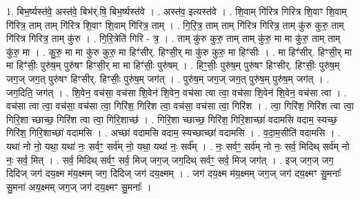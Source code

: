 \documentclass[17pt]{extarticle}
\begin{document}
1. बिभ॒र्ष्यस्त॑वे॒ अस्त॑वे॒ बिभ॑र्.षि॒ बिभ॒र्ष्यस्त॑वे । . अस्त॑व॒ इत्यस्त॑वे । . शि॒वाम् गि॑रित्र गिरित्र शि॒वाꣳ शि॒वाम् गि॑रित्र॒ ताम् ताम् गि॑रित्र शि॒वाꣳ शि॒वाम् गि॑रित्र॒ ताम् । . गि॒रि॒त्र॒ ताम् ताम् गि॑रित्र गिरित्र॒ ताम् कु॑रु कुरु॒ ताम् गि॑रित्र गिरित्र॒ ताम् कु॑रु । . गि॒रि॒त्रेति॑ गिरि - त्र॒ । . ताम् कु॑रु कुरु॒ ताम् ताम् कु॑रु॒ मा मा कु॑रु॒ ताम् ताम् कु॑रु॒ मा । . कु॒रु॒ मा मा कु॑रु कुरु॒ मा हिꣳ॑सीर्. हिꣳसी॒र् मा कु॑रु कुरु॒ मा हिꣳ॑सीः । . मा हिꣳ॑सीर्. हिꣳसी॒र् मा मा हिꣳ॑सीः॒ पुरु॑ष॒म् पुरु॑षꣳ हिꣳसी॒र् मा मा हिꣳ॑सीः॒ पुरु॑षम् । . हिꣳ॒॒सीः॒ पुरु॑ष॒म् पुरु॑षꣳ हिꣳसीर्. हिꣳसीः॒ पुरु॑ष॒म् जग॒ज् जग॒त् पुरु॑षꣳ हिꣳसीर्. हिꣳसीः॒ पुरु॑ष॒म् जग॑त् । . पुरु॑ष॒म् जग॒ज् जग॒त् पुरु॑ष॒म् पुरु॑ष॒म् जग॑त् । . जग॒दिति॒ जग॑त् । . शि॒वेन॒ वच॑सा॒ वच॑सा शि॒वेन॑ शि॒वेन॒ वच॑सा त्वा त्वा॒ वच॑सा शि॒वेन॑ शि॒वेन॒ वच॑सा त्वा । . वच॑सा त्वा त्वा॒ वच॑सा॒ वच॑सा त्वा॒ गिरि॑श॒ गिरि॑श त्वा॒ वच॑सा॒ वच॑सा त्वा॒ गिरि॑श । . त्वा॒ गिरि॑श॒ गिरि॑श त्वा त्वा॒ गिरि॒शा च्छाच्छ॒ गिरि॑श त्वा त्वा॒ गिरि॒शाच्छ॑ । . गिरि॒शा च्छाच्छ॒ गिरि॑श॒ गिरि॒शाच्छा॑ वदामसि वदाम॒ स्यच्छ॒ गिरि॑श॒ गिरि॒शाच्छा॑ वदामसि । . अच्छा॑ वदामसि वदाम॒ स्यच्छाच्छा॑ वदामसि । . व॒दा॒म॒सीति॑ वदामसि । . यथा॑ नो नो॒ यथा॒ यथा॑ नः॒ सर्वꣳ॒॒ सर्व॑म् नो॒ यथा॒ यथा॑ नः॒ सर्व᳚म् । . नः॒ सर्वꣳ॒॒ सर्व॑म् नो नः॒ सर्व॒ मिदिथ् सर्व॑म् नो नः॒ सर्व॒ मित् । . सर्व॒ मिदिथ् सर्वꣳ॒॒ सर्व॒ मिज् जग॒ज् जग॒दिथ् सर्वꣳ॒॒ सर्व॒ मिज् जग॑त् । . इज् जग॒ज् जग॒ दिदिज् जग॑ दय॒क्ष्म म॑य॒क्ष्मम् जग॒ दिदिज् जग॑ दय॒क्ष्मम् । . जग॑ दय॒क्ष्म म॑य॒क्ष्मम् जग॒ज् जग॑ दय॒क्ष्मꣳ सु॒मनाः᳚ सु॒मना॑ अय॒क्ष्मम् जग॒ज् जग॑ दय॒क्ष्मꣳ सु॒मनाः᳚ । \newline
\end{document}
